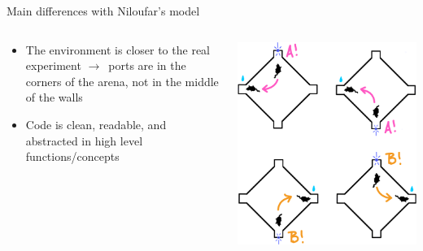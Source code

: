 \documentclass[bigger]{beamer}
\begin{document}
\begin{frame}[label={sec:org7f179d0}]{Main differences with Niloufar's model}
\begin{columns}
\begin{column}{0.7\columnwidth}
\begin{itemize}
\item The environment is \alert{closer to the real experiment} \(\to\)~ports are in the corners of the arena, not in the middle of the walls
\item Code is clean, readable, and abstracted in high level functions/concepts
\end{itemize}
\end{column}
\begin{column}{0.3\columnwidth}
\begin{center}
\includegraphics[width=\textwidth]{img/task.png}
\end{center}
\begin{center}

\end{center}
\end{column}
\end{columns}
\end{frame}
\end{document}
